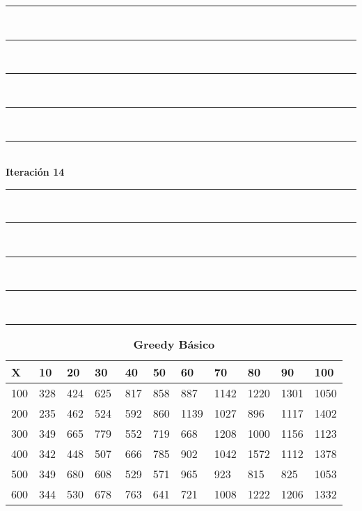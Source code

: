 \documentclass[10pt,letterpaper]{article}
\begin{document}
\newpage 
\begin{center}
\newcommand{\HRule}{\rule{\linewidth}{0.5mm}}
\center
\HRule\\[6cm]
\HRule\\[0.4cm]
\HRule\\[0.4cm]
\HRule\\[0.4cm]
\HRule\\[0.4cm]
{\centering \Huge\bfseries Iteración 14}\\[0.4cm]
\HRule\\[0.4cm]
\HRule\\[0.4cm]
\HRule\\[0.4cm]
\HRule\\[6cm]
\HRule
\end{center}
\newpage 
{}
\begin{center}
\begin{table}\renewcommand{\arraystretch}{2.5}
\caption{\large \textbf{Greedy Básico}}
\centering
\begin{tabular} { |m{0.5cm}|m{1.3cm}|m{1.3cm}|m{1.3cm}|m{1.3cm}|m{1.3cm}|m{1.3cm}|m{1.3cm}|m{1.3cm}|m{1.3cm}|m{1.3cm}|} 
\hline
\rowcolor{Gray}
\centering \textbf{X} & \centering \textbf{10} & \centering \textbf{20} & \centering \textbf{30}\ & \centering \textbf{40} & \centering \textbf{50} & \centering \textbf{60}\ & \centering \textbf{70} & \centering \textbf{80} & \centering \textbf{90}\ & \textbf{100} \\\hline
\cellcolor{Gray}100 & \Large 328 & \Large 424 & \Large 625 & \Large 817 & \Large 858 & \Large 887 & \Large 1142 & \Large 1220 & \Large 1301 & \Large 1050 \\
\hline
\cellcolor{Gray}200 & \Large 235 & \Large 462 & \Large 524 & \Large 592 & \Large 860 & \Large 1139 & \Large 1027 & \Large 896 & \Large 1117 & \Large 1402 \\
\hline
\cellcolor{Gray}300 & \Large 349 & \Large 665 & \Large 779 & \Large 552 & \Large 719 & \Large 668 & \Large 1208 & \Large 1000 & \Large 1156 & \Large 1123 \\
\hline
\cellcolor{Gray}400 & \Large 342 & \Large 448 & \Large 507 & \Large 666 & \Large 785 & \Large 902 & \Large 1042 & \Large 1572 & \Large 1112 & \Large 1378 \\
\hline
\cellcolor{Gray}500 & \Large 349 & \Large 680 & \Large 608 & \Large 529 & \Large 571 & \Large 965 & \Large 923 & \Large 815 & \Large 825 & \Large 1053 \\
\hline
\cellcolor{Gray}600 & \Large 344 & \Large 530 & \Large 678 & \Large 763 & \Large 641 & \Large 721 & \Large 1008 & \Large 1222 & \Large 1206 & \Large 1332 \\

\end{tabular}
\end{table}
\end{center}
\end{document}
